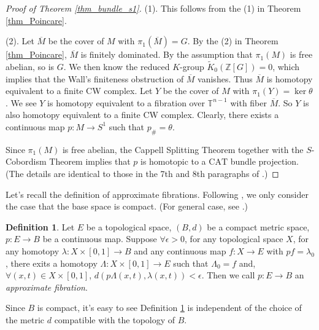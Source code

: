 \documentclass[12pt]{amsart}
\theoremstyle{plain}
\theoremstyle{definition}
\newtheorem{definition}[theorem]{Definition}
\theoremstyle{question}
\theoremstyle{remark}
\theoremstyle{assumption}
\numberwithin{equation}{section}
\theoremstyle{bigthm}
\begin{document}
\begin{proof}[Proof of Theorem \ref{thm_bundle_s1}]
(1). This follows from the (1) in Theorem \ref{thm_Poincare}.

(2). Let $\overline{M}$ be the cover of $M$ with $\pi_{1} (\overline{M}) =G$. By the (2) in Theorem \ref{thm_Poincare}, $\overline{M}$ is finitely dominated. By the assumption that $\pi_{1} (M)$ is free abelian, so is $G$. We then know the reduced $K$-group $\widetilde{K}_{0} (\mathbb{Z} [G]) =0$, which implies that the Wall's finiteness obstruction of $\overline{M}$ vanishes. Thus $\overline{M}$ is homotopy equivalent to a finite CW complex. Let $Y$ be the cover of $M$ with $\pi_{1} (Y) = \ker \theta$. We see $Y$ is homotopy equivalent to a fibration over $\mathbb{T}^{n-1}$ with fiber $\overline{M}$. So $Y$ is also homotopy equivalent to a finite CW complex. Clearly, there exists a continuous map $p \colon  M \rightarrow S^{1}$ such that $p_{\#} = \theta$.

Since $\pi_1(M)$ is free abelian, the Cappell Splitting Theorem \cite[Corollary 6]{Cappell} together with the $S$-Cobordism Theorem implies that
$p$ is homotopic to a $\mathrm{CAT}$ bundle projection. (The details are identical to those in the 7th and 8th paragraphs of \cite[p.~1899]{Qin_Su_Wang}.)
\end{proof}

Let's recall the definition of approximate fibrations. Following \cite[Definition~2.2]{FLS2018}, we only consider the case that the base space is compact. (For general case, see \cite[\S~12]{HTW90}.)
\begin{definition}\label{def_approximate_fibration}
Let $E$ be a topological space, $(B,d)$ be a compact metric space, $p \colon  E \rightarrow B$ be a continuous map. Suppose $\forall \epsilon >0$, for any topological space $X$, for any homotopy $\lambda  \colon  X \times [0,1] \rightarrow B$ and any continuous map $f \colon  X \rightarrow E$ with $pf = \lambda_{0}$, there exits a homotopy $\Lambda  \colon  X \times [0,1] \rightarrow E$ such that $\Lambda_{0} = f$ and, $\forall (x,t) \in X \times [0,1]$, $d(p \Lambda (x,t), \lambda (x,t)) < \epsilon$. Then we call $p \colon  E \rightarrow B$ an \textit{approximate fibration}.
\end{definition}
Since $B$ is compact, it's easy to see Definition \ref{def_approximate_fibration} is independent of the choice of the metric $d$ compatible with the topology of $B$.
\end{document}
